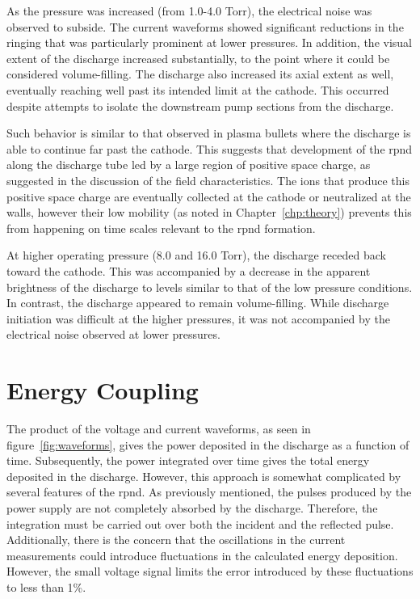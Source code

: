 As the pressure was increased (from 1.0-4.0 Torr), the electrical noise was
observed to subside. The current waveforms showed significant reductions in the
ringing that was particularly prominent at lower pressures. In addition, the
visual extent of the discharge increased substantially, to the point where it
could be considered volume-filling. The discharge also increased its axial
extent as well, eventually reaching well past its intended limit at the cathode.
This occurred despite attempts to isolate the downstream pump sections from the
discharge. 

Such behavior is similar to that observed in plasma bullets \cite{Lu2006} where
the discharge is able to continue far past the cathode. This suggests that
development of the \acs{rpnd} along the discharge tube led by a large region of
positive space charge, as suggested in the discussion of the field
characteristics. The ions that produce this positive space charge are eventually
collected at the cathode or neutralized at the walls, however their low mobility
(as noted in Chapter~\ref{chp:theory}) prevents this from happening on time
scales relevant to the \acs{rpnd} formation.

At higher operating pressure (8.0 and 16.0 Torr), the discharge receded back
toward the cathode. This was accompanied by a decrease in the apparent
brightness of the discharge to levels similar to that of the low pressure
conditions. In contrast, the discharge appeared to remain volume-filling. While
discharge initiation was difficult at the higher pressures, it was not
accompanied by the electrical noise observed at lower pressures.

\section{Energy Coupling}

The product of the voltage and current waveforms, as seen in
figure~\ref{fig:waveforms}, gives the power deposited in the discharge as a
function of time. Subsequently, the power integrated over time gives the total
energy deposited in the discharge. However, this approach is somewhat
complicated by several features of the \acs{rpnd}. As previously mentioned, the
pulses produced by the power supply are not completely absorbed by the
discharge. Therefore, the integration must be carried out over both the incident
and the reflected pulse. Additionally, there is the concern that the
oscillations in the current measurements could introduce fluctuations in the
calculated energy deposition. However, the small voltage signal limits the error
introduced by these fluctuations to less than 1\%.

